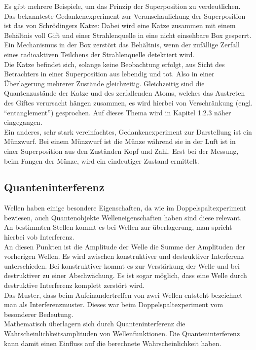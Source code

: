Es gibt mehrere Beispiele, um das Prinzip der Superposition zu verdeutlichen. Das bekannteste Gedankenexperiment zur Veranschaulichung der Superposition ist das von Schrödingers Katze: Dabei wird eine Katze zusammen mit einem Behältnis voll Gift und einer Strahlenquelle in eine nicht einsehbare Box gesperrt. Ein Mechanismus in der Box zerstört das Behältnis, wenn der zufällige Zerfall eines radioaktiven Teilchens der Strahlenquelle detektiert wird.\\
Die Katze befindet sich, solange keine Beobachtung erfolgt, aus Sicht des Betrachters in einer Superposition aus lebendig und tot. Also in einer Überlagerung mehrerer Zustände gleichzeitig. Gleichzeitig sind die Quantenzustände der Katze und des zerfallenden Atoms, welches das Austreten des Giftes verursacht hängen zusammen, es wird hierbei von Verschränkung (engl. ``entanglement'') gesprochen. Auf dieses Thema wird in Kapitel 1.2.3 näher eingegangen.\\
Ein anderes, sehr stark vereinfachtes, Gedankenexperiment zur Darstellung ist ein Münzwurf. Bei einem Münzwurf ist die Münze während sie in der Luft ist in einer Superposition aus den Zuständen Kopf und Zahl. Erst bei der Messung, beim Fangen der Münze, wird ein eindeutiger Zustand ermittelt.\\

\subsection{Quanteninterferenz}

Wellen haben einige besondere Eigenschaften, da wie im Doppelspaltexperiment bewiesen, auch Quantenobjekte Welleneigenschaften haben sind diese relevant. An bestimmten Stellen kommt es bei Wellen zur überlagerung, man spricht hierbei vob Interferenz.\\
An diesen Punkten ist die Amplitude der Welle die Summe der Amplituden der vorherigen Wellen. Es wird zwischen konstruktiver und destruktiver Interferenz unterschieden. Bei konstruktiver kommt es zur Verstärkung der Welle und bei destruktiver zu einer Abschwächung. Es ist sogar möglich, dass eine Welle durch destruktive Interferenz komplett zerstört wird.\\
Das Muster, dass beim Aufeinandertreffen von zwei Wellen entsteht bezeichnet man als Interferenzmuster. Dieses war beim Doppelspaltexperiment vom besonderer Bedeutung.\\
Mathematisch überlagern sich durch Quanteninterferenz die Wahrscheinlichkeitsamplituden von Wellenfunktionen. Die Quanteninterferenz kann damit einen Einfluss auf die berechnete Wahrscheinlichkeit haben.
\\

